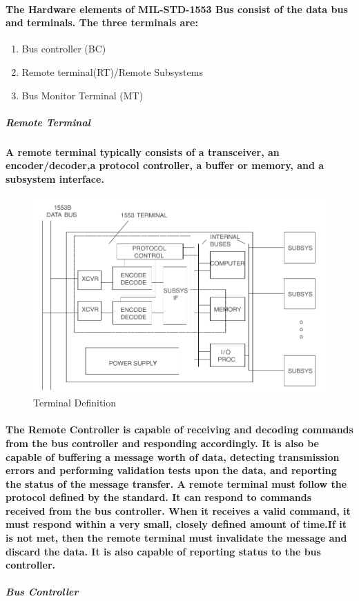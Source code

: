 \documentclass[12pt,a4paper]{report}
\begin{document}
\paragraph{\textrm{\textmd{The Hardware elements of	MIL-STD-1553 Bus consist of the data bus and terminals. The three terminals are:}}}
\begin{enumerate}
	\item Bus controller (BC)
	\item Remote terminal(RT)/Remote Subsystems
	\item Bus Monitor Terminal (MT)
\end{enumerate} 
\subparagraph{Remote Terminal}
\paragraph{\textrm{\textmd{A remote terminal typically consists of a transceiver, an encoder/decoder,a protocol controller, a buffer or memory, and a subsystem interface.}}}
\begin{figure}[h]
	\centering
	\includegraphics[scale=.4]{rt.png}
	\caption{Terminal Definition}
	\label{fig:rt}
\end{figure}
\paragraph{\textrm{\textmd{The Remote Controller is
capable of receiving and decoding commands from the bus controller and
responding accordingly. It is also be capable of buffering a message
worth of data, detecting transmission errors and performing validation tests upon the data, and reporting the status of the message transfer. 
A remote terminal must follow the protocol defined by the standard. It can respond to commands received from the bus controller. When it receives a valid command, it must respond
within a very small, closely defined amount of time.If it is not met, then the remote terminal must
invalidate the message and discard the data. It is also capable of reporting status to the bus controller.}}}	
\subparagraph{Bus Controller}
\end{document}
